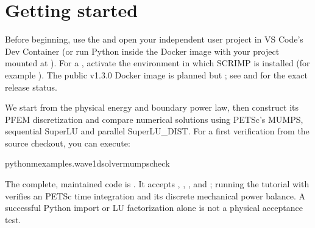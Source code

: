 \documentclass[letterpaper,10pt,english]{sphinxmanual}
\begin{document}
\sphinxstepscope


\section{Getting started}
\label{\detokenize{started:getting-started}}\label{\detokenize{started::doc}}\label{\detokenize{started:started}}
\sphinxAtStartPar
Before beginning, use the  and
open your independent user project in VS Code’s Dev Container (or run
Python inside the Docker image with your project mounted at ).
For a , activate the environment in which
SCRIMP is installed (for example ).
The public v1.3.0 Docker image is planned but ;
see {\hyperref[\detokenize{install::doc}]{}} and {\hyperref[\detokenize{vscode::doc}]{}} for the exact release status.

\sphinxAtStartPar
{} We start from the physical energy and boundary power law,
then construct its PFEM discretization and compare numerical solutions
using PETSc’s MUMPS, sequential SuperLU and parallel SuperLU\_DIST.
For a first verification from the source checkout, you can execute:

\begin{sphinxVerbatim}[commandchars=\\\{\}]
python\PYGZhy{}mexamples.wave\PYGZus{}1d\PYGZhy{}\PYGZhy{}solvermumps\PYGZhy{}\PYGZhy{}check
\end{sphinxVerbatim}

\sphinxAtStartPar
The complete, maintained code is .
It accepts , , ,
 and ; running the tutorial with
 verifies an  PETSc time integration and its
discrete mechanical power balance. A successful Python import or
LU factorization alone is not a physical acceptance test.
\end{document}
